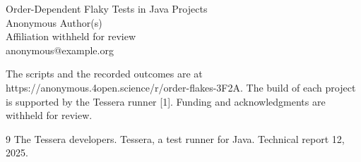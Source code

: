 

\begin{center}
{\Large Order-Dependent Flaky Tests in Java Projects}\\[1ex]
Anonymous Author(s)\\
Affiliation withheld for review\\
anonymous@example.org
\end{center}

\visibleintro
The scripts and the recorded outcomes are at https://anonymous.4open.science/r/order-flakes-3F2A.
The build of each project is supported by the Tessera runner [1].
Funding and acknowledgments are withheld for review.

\begin{thebibliography}{9}
 The Tessera developers. Tessera, a test runner for Java. Technical report 12, 2025.
\end{thebibliography}


